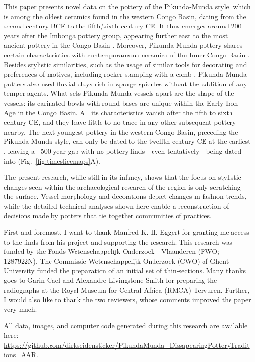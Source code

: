 \documentclass[smallextended,natbib]{svjour3}       %
\begin{document}
This paper presents novel data on the pottery of the Pikunda-Munda style, which is among the oldest ceramics found in the western Congo Basin, dating from the second century BCE to the fifth/sixth century CE. It thus emerges around 200 years after the Imbonga pottery group, appearing further east to the most ancient pottery in the Congo Basin \cite[Fig.~\ref{fig:timeslicemaps};][59--68]{Wotzka.1995}. Moreover, Pikunda-Munda pottery shares certain characteristics with contemporaneous ceramics of the Inner Congo Basin \citep[107 Ftn.~4]{Wotzka.1995}. Besides stylistic similarities, such as the usage of similar tools for decorating and preferences of motives, including rocker-stamping with a comb \citep[118 Tab.~14]{Seidensticker.2021e}, Pikunda-Munda potters also used fluvial clays rich in sponge spicules without the addition of any temper agents. What sets Pikunda-Munda vessels apart are the shape of the vessels: its carinated bowls with round bases are unique within the Early Iron Age in the Congo Basin. All its characteristics vanish after the fifth to sixth century CE, and they leave little to no trace in any other subsequent pottery nearby. The next youngest pottery in the western Congo Basin, preceding the Pikunda-Munda style, can only be dated to the twelfth century CE at the earliest \citep[Tab.~2: RICH-30864]{Seidensticker.2024}, leaving a ~500 year gap with no pottery finds---even tentatively---being dated into (Fig.~\ref{fig:timeslicemaps}A).

The present research, while still in its infancy, shows that the focus on stylistic changes seen within the archaeological research of the region \citep{Wotzka.1995,Seidensticker.2021e} is only scratching the surface. Vessel morphology and decorations depict changes in fashion trends, while the detailed technical analyses shown here enable a reconstruction of decisions made by potters that tie together communities of practices.

\begin{acknowledgements}
First and foremost, I want to thank Manfred K. H. Eggert for granting me access to the finds from his project and supporting the research. This research was funded by the Fonds Wetenschappelijk Onderzoek - Vlaanderen (FWO; 1287922N). The Commissie Wetenschappelijk Onderzoek (CWO) of Ghent University funded the preparation of an initial set of thin-sections. Many thanks goes to Garin Cael and Alexandre Livingstone Smith for preparing the radiographs at the Royal Museum for Central Africa (RMCA) Tervuren. Further, I would also like to thank the two reviewers, whose comments improved the paper very much.

All data, images, and computer code generated during this research are available here: \url{https://github.com/dirkseidensticker/PikundaMunda_DissapearingPotteryTraditions_AAR}.
\end{acknowledgements}



\end{document}
